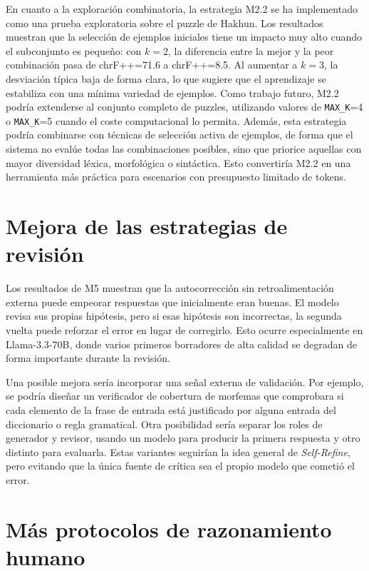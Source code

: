 \vspace{0.5cm}

En cuanto a la exploración combinatoria, la estrategia M2.2 se ha implementado como una prueba exploratoria sobre el puzzle de Hakhun. Los resultados muestran que la selección de ejemplos iniciales tiene un impacto muy alto cuando el subconjunto es pequeño: con $k=2$, la diferencia entre la mejor y la peor combinación pasa de chrF++=71.6 a chrF++=8.5. Al aumentar a $k=3$, la desviación típica baja de forma clara, lo que sugiere que el aprendizaje se estabiliza con una mínima variedad de ejemplos. Como trabajo futuro, M2.2 podría extenderse al conjunto completo de puzzles, utilizando valores de \texttt{MAX\_K}=4 o \texttt{MAX\_K}=5 cuando el coste computacional lo permita. Además, esta estrategia podría combinarse con técnicas de selección activa de ejemplos, de forma que el sistema no evalúe todas las combinaciones posibles, sino que priorice aquellas con mayor diversidad léxica, morfológica o sintáctica. Esto convertiría M2.2 en una herramienta más práctica para escenarios con presupuesto limitado de tokens.

\section{Mejora de las estrategias de revisión}
\label{sec:futuro_revision}

Los resultados de M5 muestran que la autocorrección sin retroalimentación externa puede empeorar respuestas que inicialmente eran buenas. El modelo revisa sus propias hipótesis, pero si esas hipótesis son incorrectas, la segunda vuelta puede reforzar el error en lugar de corregirlo. Esto ocurre especialmente en Llama-3.3-70B, donde varios primeros borradores de alta calidad se degradan de forma importante durante la revisión.

Una posible mejora sería incorporar una señal externa de validación. Por ejemplo, se podría diseñar un verificador de cobertura de morfemas que comprobara si cada elemento de la frase de entrada está justificado por alguna entrada del diccionario o regla gramatical. Otra posibilidad sería separar los roles de generador y revisor, usando un modelo para producir la primera respuesta y otro distinto para evaluarla. Estas variantes seguirían la idea general de \textit{Self-Refine}, pero evitando que la única fuente de crítica sea el propio modelo que cometió el error.

\section{Más protocolos de razonamiento humano}
\label{sec:futuro_humano}

